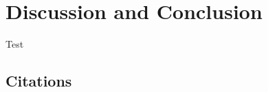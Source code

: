\documentclass[12pt,]{article}
\begin{document}
\section{Discussion and Conclusion}\label{discussion-and-conclusion}

Test

\subsection{Citations}\label{citations}




\newpage
\singlespacing 

\end{document}
